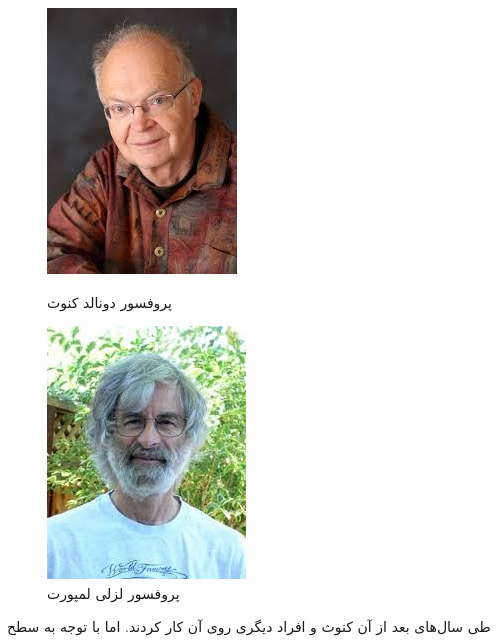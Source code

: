 \begin{figure}[tbp]
\begin{minipage}{.4\textwidth}
\centering
\includegraphics[width=.6\textwidth]{knuth}
\caption{پروفسور دونالد کنوث }
\end{minipage}
\hfill
\begin{minipage}{.4\textwidth}
\centering
\includegraphics[width=.6\textwidth]{lamport}
\caption{پروفسور لزلی لمپورت }
\end{minipage}
\end{figure}
طی سال‌های بعد از آن کنوث و افراد دیگری روی آن کار کردند. اما با توجه به سطح
